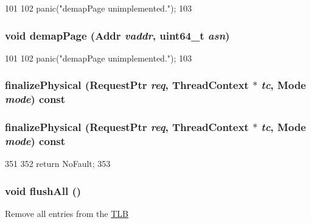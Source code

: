\begin{DoxyCode}
101     {
102         panic("demapPage unimplemented.\n");
103     }
\end{DoxyCode}
\hypertarget{classMipsISA_1_1TLB_a2d698ff909513b48a1263f8a5440e067}{
\subsubsection[{demapPage}]{\setlength{\rightskip}{0pt plus 5cm}void demapPage ({\bf Addr} {\em vaddr}, \/  uint64\_\-t {\em asn})}}
\label{classMipsISA_1_1TLB_a2d698ff909513b48a1263f8a5440e067}



\begin{DoxyCode}
101     {
102         panic("demapPage unimplemented.\n");
103     }
\end{DoxyCode}
\hypertarget{classMipsISA_1_1TLB_ae199d95c42e036851a8a0543c6d6d2e3}{
\subsubsection[{finalizePhysical}]{ finalizePhysical ({\bf RequestPtr} {\em req}, \/  {\bf ThreadContext} $\ast$ {\em tc}, \/  {\bf Mode} {\em mode}) const}}
\label{classMipsISA_1_1TLB_ae199d95c42e036851a8a0543c6d6d2e3}
\hypertarget{classMipsISA_1_1TLB_ae199d95c42e036851a8a0543c6d6d2e3}{
\subsubsection[{finalizePhysical}]{ finalizePhysical ({\bf RequestPtr} {\em req}, \/  {\bf ThreadContext} $\ast$ {\em tc}, \/  {\bf Mode} {\em mode}) const}}
\label{classMipsISA_1_1TLB_ae199d95c42e036851a8a0543c6d6d2e3}



\begin{DoxyCode}
351 {
352     return NoFault;
353 }
\end{DoxyCode}
\hypertarget{classMipsISA_1_1TLB_aca1483a67aee5a91e442f7131d66bcbd}{
\subsubsection[{flushAll}]{\setlength{\rightskip}{0pt plus 5cm}void flushAll ()}}
\label{classMipsISA_1_1TLB_aca1483a67aee5a91e442f7131d66bcbd}
Remove all entries from the \hyperlink{classMipsISA_1_1TLB}{TLB} 

